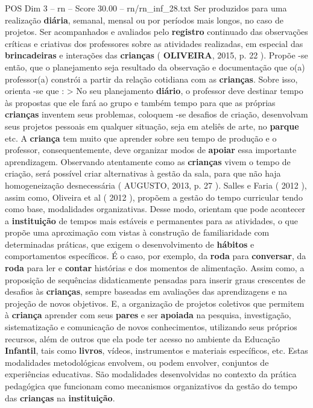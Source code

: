 \begin{textsample}{POS Dim 3 – rn – Score 30.00 – rn/rn\_inf\_28.txt}
Ser produzidos para uma realização \textbf{diária}, semanal, mensal ou por períodos mais longos, no caso de projetos.
Ser acompanhados e avaliados pelo \textbf{registro} continuado das observações críticas e criativas dos professores sobre as atividades realizadas, em especial das \textbf{brincadeiras} e interações das \textbf{crianças} ( \textbf{OLIVEIRA}, 2015, p. 22 ).
Propõe -se então, que o planejamento seja resultado da observação e documentação que o(a) professor(a) constrói a partir da relação cotidiana com as \textbf{crianças}.
Sobre isso, orienta -se que : > No seu planejamento \textbf{diário}, o professor deve destinar tempo às propostas que ele fará ao grupo e também tempo para que as próprias \textbf{crianças} inventem seus problemas, coloquem -se desafios de criação, desenvolvam seus projetos pessoais em qualquer situação, seja em ateliês de arte, no \textbf{parque} etc.
A \textbf{criança} tem muito que aprender sobre seu tempo de produção e o professor, consequentemente, deve organizar modos de \textbf{apoiar} essa importante aprendizagem.
Observando atentamente como as \textbf{crianças} vivem o tempo de criação, será possível criar alternativas à gestão da sala, para que não haja homogeneização desnecessária ( AUGUSTO, 2013, p. 27 ).
Salles e Faria ( 2012 ), assim como, Oliveira et al ( 2012 ), propõem a gestão do tempo curricular tendo como base, modalidades organizativas.
Desse modo, orientam que pode acontecer a \textbf{instituição} de tempos mais estáveis e permanentes para as atividades, o que propõe uma aproximação com vistas à construção de familiaridade com determinadas práticas, que exigem o desenvolvimento de \textbf{hábitos} e comportamentos específicos.
É o caso, por exemplo, da \textbf{roda} para \textbf{conversar}, da \textbf{roda} para ler e \textbf{contar} histórias e dos momentos de alimentação.
Assim como, a proposição de sequências didaticamente pensadas para inserir graus crescentes de desafios às \textbf{crianças}, sempre baseadas em avaliações das aprendizagens e na projeção de novos objetivos.
E, a organização de projetos coletivos que permitem à \textbf{criança} aprender com seus \textbf{pares} e ser \textbf{apoiada} na pesquisa, investigação, sistematização e comunicação de novos conhecimentos, utilizando seus próprios recursos, além de outros que ela pode ter acesso no ambiente da Educação \textbf{Infantil}, tais como \textbf{livros}, vídeos, instrumentos e materiais específicos, etc.
Estas modalidades metodológicas envolvem, ou podem envolver, conjuntos de experiências educativas.
São modalidades desenvolvidas no contexto da prática pedagógica que funcionam como mecanismos organizativos da gestão do tempo das \textbf{crianças} na \textbf{instituição}.

\end{textsample}
